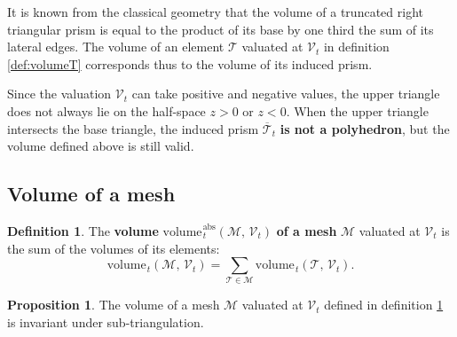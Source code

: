 \documentclass{article}
\theoremstyle{definition}
\newtheorem{defn}{Definition}
\newtheorem{prop}{Proposition}
\newcommand{\MM}{\mathcal{M}}
\newcommand{\VV}{\mathcal{V}}
\newcommand{\TT}{\mathcal{T}}
\newcommand{\vol}{\mathrm{volume\hspace{1pt}}}
\newcommand{\absvol}{\mathrm{volume\hspace{1pt}}^\mathrm{abs}}
\begin{document}
It is known from the classical geometry that the volume of a truncated right triangular prism is equal to the product of its base by one third the sum of its lateral edges. The volume of an element $\TT$ valuated at $\VV_t$ in definition \ref{def:volumeT} corresponds thus to the volume of its induced prism.

Since the valuation $\VV_t$ can take positive and negative values, the upper triangle does not always lie on the half-space $z >0$ or $z<0$. When the upper triangle intersects the base triangle, the induced prism $\overline{\TT}_t$ \textbf{is not a polyhedron}, but the volume defined above is still valid.

\subsection{Volume of a mesh}
\begin{defn}
The \textbf{volume} $\absvol_t(\MM,\,\VV_t)$ \textbf{of a mesh} $\MM$ valuated at $\VV_t$ is the sum of the volumes of its elements:
\[\vol_t(\MM,\,\VV_t) = \sum_{\TT\in\MM}\vol_t(\TT,\,\VV_t).\]
\label{def:VolumeM}\end{defn}

\begin{prop}
The volume of a mesh $\MM$ valuated at $\VV_t$ defined in definition \ref{def:VolumeM} is invariant under sub-triangulation.\label{prop:volume-invariant}
\end{prop}
\end{document}
